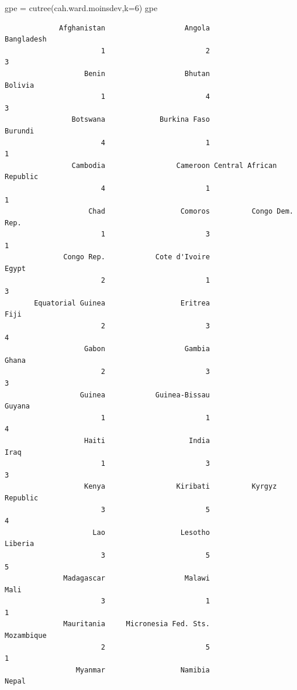 \documentclass[
]{article}
\newenvironment{Shaded}{}{}
\newcommand{\AttributeTok}[1]{#1}
\newcommand{\DecValTok}[1]{#1}
\newcommand{\FunctionTok}[1]{#1}
\newcommand{\NormalTok}[1]{#1}
\newcommand{\OtherTok}[1]{\textcolor[rgb]{1.00,0.25,0.00}{#1}}
\begin{document}
\begin{Shaded}
\begin{Highlighting}[]
\NormalTok{gpe }\OtherTok{=} \FunctionTok{cutree}\NormalTok{(cah.ward.moinsdev,}\AttributeTok{k=}\DecValTok{6}\NormalTok{)}
\NormalTok{gpe}
\end{Highlighting}
\end{Shaded}

\begin{verbatim}
             Afghanistan                   Angola               Bangladesh 
                       1                        2                        3 
                   Benin                   Bhutan                  Bolivia 
                       1                        4                        3 
                Botswana             Burkina Faso                  Burundi 
                       4                        1                        1 
                Cambodia                 Cameroon Central African Republic 
                       4                        1                        1 
                    Chad                  Comoros          Congo Dem. Rep. 
                       1                        3                        1 
              Congo Rep.            Cote d'Ivoire                    Egypt 
                       2                        1                        3 
       Equatorial Guinea                  Eritrea                     Fiji 
                       2                        3                        4 
                   Gabon                   Gambia                    Ghana 
                       2                        3                        3 
                  Guinea            Guinea-Bissau                   Guyana 
                       1                        1                        4 
                   Haiti                    India                     Iraq 
                       1                        3                        3 
                   Kenya                 Kiribati          Kyrgyz Republic 
                       3                        5                        4 
                     Lao                  Lesotho                  Liberia 
                       3                        5                        5 
              Madagascar                   Malawi                     Mali 
                       3                        1                        1 
              Mauritania     Micronesia Fed. Sts.               Mozambique 
                       2                        5                        1 
                 Myanmar                  Namibia                    Nepal 

\end{verbatim}
\end{document}
